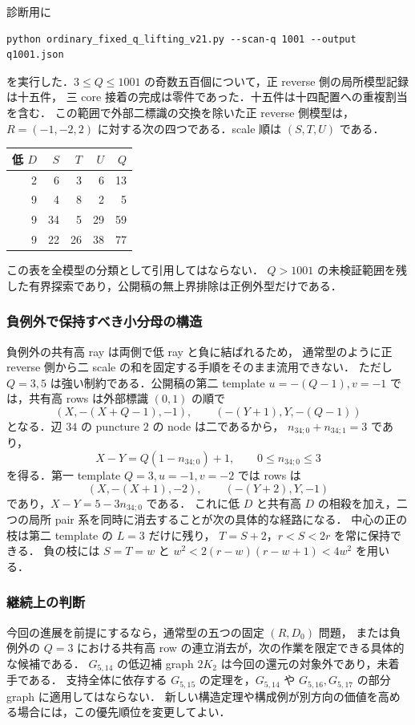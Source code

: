 診断用に
\begin{verbatim}
python ordinary_fixed_q_lifting_v21.py --scan-q 1001 --output q1001.json
\end{verbatim}
を実行した．$3\le Q\le1001$ の奇数五百個について，正 reverse 側の局所模型記録は十五件，
三 core 接着の完成は零件であった．十五件は十四配置への重複割当を含む．
この範囲で外部二標識の交換を除いた正 reverse 側模型は，
$R=(-1,-2,2)$ に対する次の四つである．scale 順は $(S,T,U)$ である．
\begin{center}\small
\begin{tabular}{r|rrr|r}
低 $D$&$S$&$T$&$U$&$Q$\\\hline
2&6&3&6&13\\
9&4&8&2&5\\
9&34&5&29&59\\
9&22&26&38&77
\end{tabular}
\end{center}
この表を全模型の分類として引用してはならない．
$Q>1001$ の未検証範囲を残した有界探索であり，公開稿の無上界排除は正例外型だけである．

\subsubsection{負例外で保持すべき小分母の構造}

負例外の共有高 ray は両側で低 ray と負に結ばれるため，
通常型のように正 reverse 側から二 scale の和を固定する手順をそのまま流用できない．
ただし $Q=3,5$ は強い制約である．公開稿の第二 template
$u=-(Q-1),v=-1$ では，共有高 rows は外部標識 $(0,1)$ の順で
\[
 (X,-(X+Q-1),-1),\qquad (-(Y+1),Y,-(Q-1))
\]
となる．辺 $34$ の puncture $2$ の node は二であるから，
$n_{34;0}+n_{34;1}=3$ であり，
\[
 X-Y=Q(1-n_{34;0})+1,\qquad 0\le n_{34;0}\le3
\]
を得る．第一 template $Q=3,u=-1,v=-2$ では rows は
\[
 (X,-(X+1),-2),\qquad (-(Y+2),Y,-1)
\]
であり，$X-Y=5-3n_{34;0}$ である．
これに低 $D$ と共有高 $D$ の相殺を加え，二つの局所 pair 系を同時に消去することが次の具体的な経路になる．
中心の正の枝は第二 template の $L=3$ だけに残り，
$T=S+2$，$r<S<2r$ を常に保持できる．
負の枝には $S=T=w$ と $w^2<2(r-w)(r-w+1)<4w^2$ を用いる．

\subsubsection{継続上の判断}

今回の進展を前提にするなら，通常型の五つの固定 $(R,D_0)$ 問題，
または負例外の $Q=3$ における共有高 row の連立消去が，次の作業を限定できる具体的な候補である．
$G_{5,14}$ の低辺補 graph $2K_2$ は今回の還元の対象外であり，未着手である．
支持全体に依存する $G_{5,15}$ の定理を，$G_{5,14}$ や $G_{5,16},G_{5,17}$ の部分 graph に適用してはならない．
新しい構造定理や構成例が別方向の価値を高める場合には，この優先順位を変更してよい．
